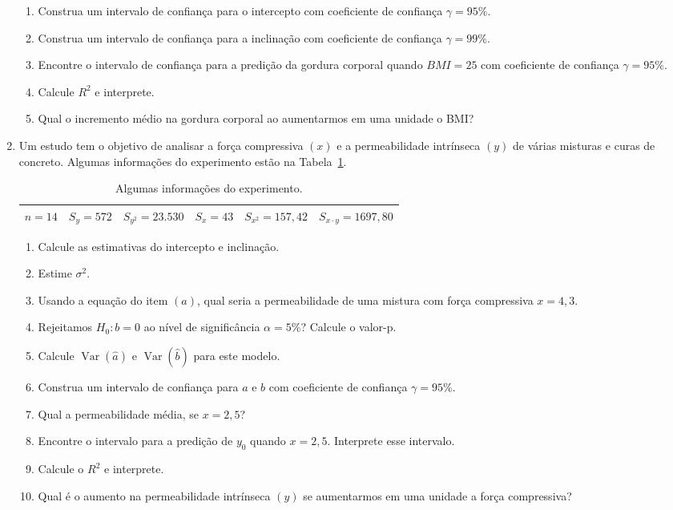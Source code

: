 \documentclass[12pt, a4paper]{article}
\DeclareMathOperator {\vari}{Var}
\begin{document}
\begin{enumerate}
\begin{enumerate}
		\item Construa um intervalo de confiança para o intercepto com coeficiente de confiança $\gamma=95\%$.
		\item Construa um intervalo de confiança para a inclinação com coeficiente de confiança $\gamma=99\%$.
		\item Encontre o intervalo de confiança para a predição da gordura corporal quando $BMI=25$ com coeficiente de confiança $\gamma=95\%$. 
		\item Calcule $R^2$ e interprete.
		\item Qual o incremento médio na gordura corporal ao aumentarmos em uma unidade o BMI?
	\end{enumerate}

	\item Um estudo tem o objetivo de analisar a força compressiva $(x)$ e a permeabilidade intrínseca $(y)$ de várias misturas e curas de concreto. Algumas informações do experimento estão na Tabela~\ref{tab:concreto-permeabilidade}. 
	\begin{table}[htbp]
		\centering
		\begin{tabular}{cccccc}
			\toprule[0.05cm]
			$n=14$ & $S_y = 572$ & $S_{y^2}=23.530$ & $S_x = 43$ & $S_{x^2} = 157,42$ & $S_{x\cdot y} = 1697,80$\\
			\bottomrule[0.05cm]
		\end{tabular}
		\caption{Algumas informações do experimento.}
		\label{tab:concreto-permeabilidade}
	\end{table}
	\begin{enumerate}
		\item Calcule as estimativas do intercepto e inclinação.
		\item Estime $\sigma^2$.
		\item Usando a equação do item $(a)$, qual seria a permeabilidade de uma mistura com força compressiva $x= 4,3$.
		\item Rejeitamos $H_0: b = 0$ ao nível de significância $\alpha=5\%$? Calcule o valor-p.
		\item Calcule $\vari\left(\hat{a}\right)$ e $\vari\left(\hat{b}\right)$ para este modelo.
		\item Construa um intervalo de confiança para $a$ e $b$ com coeficiente de confiança $\gamma=95\%$.
		\item Qual a permeabilidade média, se $x=2,5$?
		\item Encontre o intervalo para a predição de $y_0$ quando $x=2,5$. Interprete esse intervalo.
		\item Calcule o $R^2$ e interprete.
		\item Qual é o aumento na permeabilidade  intrínseca $(y)$ se aumentarmos em uma unidade a força compressiva?
	\end{enumerate}	


\end{enumerate}
\end{document}
